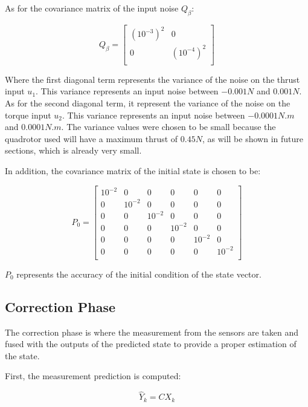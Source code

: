 \documentclass{thesisreport}
\begin{document}
As for the covariance matrix of the input noise $Q_{\beta}$:

\begin{equation}
	Q_{\beta} = \begin{bmatrix}
	(10^{-3})^2 & 0 \\
	0 & (10^{-4})^2 \\
	\end{bmatrix}
\end{equation}

Where the first diagonal term represents the variance of the noise on the thrust input $u_1$. This variance represents an input noise between $-0.001N$ and $0.001N$. As for the second diagonal term, it represent the variance of the noise on the torque input $u_2$. This variance represents  an input noise between $-0.0001N.m$ and $0.0001N.m$. The variance values were chosen to be small because the quadrotor used will have a maximum thrust of $0.45N$, as will be shown in future sections, which is already very small. 


In addition, the covariance matrix of the initial state is chosen to be:

\begin{equation}
P_0 = \begin{bmatrix}
                10^{-2} & 0 & 0 & 0  & 0 & 0 \\
                0 & 10^{-2} & 0 & 0  & 0 & 0 \\
                0 & 0 & 10^{-2} & 0 & 0 & 0 \\
                0 & 0 & 0 & 10^{-2} & 0 & 0 \\
                0 & 0 & 0 & 0 & 10^{-2} & 0 \\
                0 & 0 & 0 & 0 & 0 & 10^{-2} \\
            \end{bmatrix}
\end{equation}

$P_0$ represents the accuracy of the initial condition of the state vector.

	\subsection{Correction Phase}
	The correction phase is where the measurement from the sensors are taken and fused with the outputs of the predicted state to provide a proper estimation of the state.
	
First, the measurement prediction is computed: 

	\begin{equation}
        \hat{Y}_k = C X_k 
    \end{equation}
    
\end{document}

